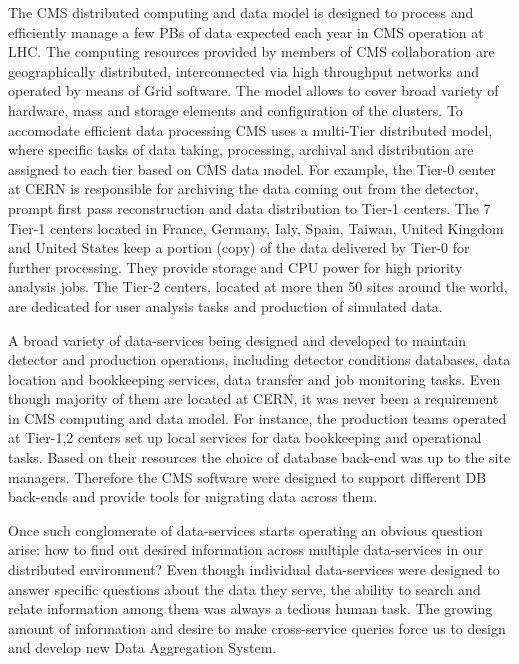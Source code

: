 \documentclass[a4paper]{jpconf}
\begin{document}
The CMS distributed computing and data model \cite{CMSDataModel} 
is designed to process
and efficiently manage a few PBs of data expected each year
in CMS operation at LHC. The computing resources provided by members of CMS
collaboration are geographically distributed, 
interconnected via high throughput networks and operated by means 
of Grid software. The model allows to cover broad variety of
hardware, mass and storage elements and configuration of the
clusters. To accomodate efficient data processing CMS uses
a multi-Tier distributed model, where specific tasks of data taking,
processing, archival and distribution are assigned to each tier based
on CMS data model. For example, the Tier-0 center at CERN is responsible
for archiving the data coming out from the detector, prompt first pass reconstruction
and data distribution to Tier-1 centers. The 7 Tier-1 centers
located in France, Germany, Ialy, Spain, Taiwan, United Kingdom and United States
keep a portion (copy) of the data delivered by Tier-0 for further processing.
They provide storage and CPU power for high priority analysis jobs.
The Tier-2 centers, located at more then 50 sites around the world,
are dedicated for user analysis tasks and production of simulated data.

A broad variety of data-services being designed and developed to
maintain detector and production operations, including detector
conditions databases, data location and bookkeeping services,
data transfer and job monitoring tasks. Even though majority of them
are located at CERN, it was never been a requirement in CMS computing
and data model. For instance, the production teams operated at Tier-1,2
centers set up local services for data bookkeeping and operational
tasks. Based on their resources the choice of database back-end was
up to the site managers. Therefore the CMS software were designed to support different
DB back-ends and provide tools for migrating data across them.

Once such conglomerate of data-services starts operating an obvious
question arise: how to find out desired information across multiple data-services
in our distributed environment? Even though individual data-services were designed
to answer specific questions about the data they serve, the ability to search and relate
information among them was always a tedious human task. The growing amount of information
and desire to make cross-service queries force us to design and develop new
Data Aggregation System.
\end{document}
